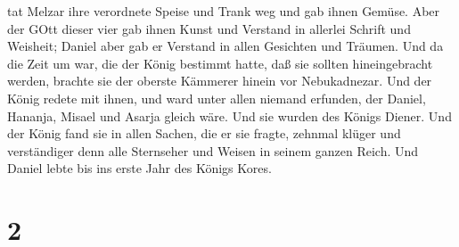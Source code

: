 tat Melzar ihre verordnete Speise und Trank weg und gab ihnen Gemüse.
 Aber der GOtt dieser vier gab ihnen Kunst und Verstand in
allerlei Schrift und Weisheit; Daniel aber gab er Verstand in allen
Gesichten und Träumen.  Und da die Zeit um war, die der
König bestimmt hatte, daß sie sollten hineingebracht werden, brachte sie
der oberste Kämmerer hinein vor Nebukadnezar.  Und der
König redete mit ihnen, und ward unter allen niemand erfunden, der
Daniel, Hananja, Misael und Asarja gleich wäre. Und sie wurden des
Königs Diener.  Und der König fand sie in allen Sachen, die
er sie fragte, zehnmal klüger und verständiger denn alle Sternseher und
Weisen in seinem ganzen Reich.  Und Daniel lebte bis ins
erste Jahr des Königs Kores.

\hypertarget{section-1}{%
\section{2}\label{section-1}}

